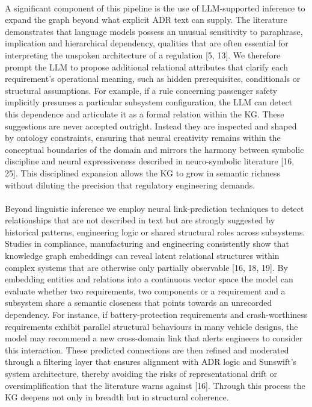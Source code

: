         \paragraph{}
        A significant component of this pipeline is the use of LLM-supported inference to expand the graph beyond what explicit ADR text can supply. The literature demonstrates that language models possess an unusual sensitivity to paraphrase, implication and hierarchical dependency, qualities that are often essential for interpreting the unspoken architecture of a regulation [5, 13]. We therefore prompt the LLM to propose additional relational attributes that clarify each requirement’s operational meaning, such as hidden prerequisites, conditionals or structural assumptions. For example, if a rule concerning passenger safety implicitly presumes a particular subsystem configuration, the LLM can detect this dependence and articulate it as a formal relation within the KG. These suggestions are never accepted outright. Instead they are inspected and shaped by ontology constraints, ensuring that neural creativity remains within the conceptual boundaries of the domain and mirrors the harmony between symbolic discipline and neural expressiveness described in neuro-symbolic literature [16, 25]. This disciplined expansion allows the KG to grow in semantic richness without diluting the precision that regulatory engineering demands.

        \paragraph{}
        Beyond linguistic inference we employ neural link-prediction techniques to detect relationships that are not described in text but are strongly suggested by historical patterns, engineering logic or shared structural roles across subsystems. Studies in compliance, manufacturing and engineering consistently show that knowledge graph embeddings can reveal latent relational structures within complex systems that are otherwise only partially observable [16, 18, 19]. By embedding entities and relations into a continuous vector space the model can evaluate whether two requirements, two components or a requirement and a subsystem share a semantic closeness that points towards an unrecorded dependency. For instance, if battery-protection requirements and crash-worthiness requirements exhibit parallel structural behaviours in many vehicle designs, the model may recommend a new cross-domain link that alerts engineers to consider this interaction. These predicted connections are then refined and moderated through a filtering layer that ensures alignment with ADR logic and Sunswift’s system architecture, thereby avoiding the risks of representational drift or oversimplification that the literature warns against [16]. Through this process the KG deepens not only in breadth but in structural coherence.

